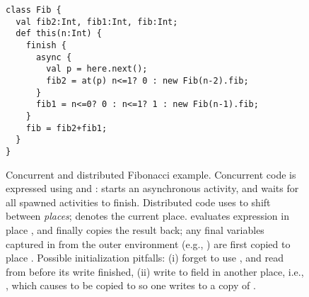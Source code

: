 

\begin{figure}
\vspace{-0.2cm}\begin{lstlisting}
class Fib {
  val fib2:Int, fib1:Int, fib:Int;
  def this(n:Int) {
    finish {
      async {
        val p = here.next();
        fib2 = at(p) n<=1? 0 : new Fib(n-2).fib;
      }
      fib1 = n<=0? 0 : n<=1? 1 : new Fib(n-1).fib;
    }
    fib = fib2+fib1;
  }
}
\end{lstlisting}\vspace{-0.2cm}
\caption{Concurrent and distributed Fibonacci example.
    Concurrent code is expressed using  and :
         starts an asynchronous activity,
        and  waits for all spawned activities to finish.
    Distributed code uses  to shift between
        \emph{places};
         denotes the current place.
     evaluates expression 
        in place , and finally copies the result back;
        any final variables captured in  from
        the outer environment (e.g., )
        are first copied to place .
    Possible initialization pitfalls:
        (i) %
            forget to use ,
            and read from  before its write finished,
        (ii) %
            write to field  in another place, i.e.,
            ,
            which causes \this to be copied to 
            so one writes to a copy of \this.
    }
\label{Figure:DistributedFib}
\end{figure}

